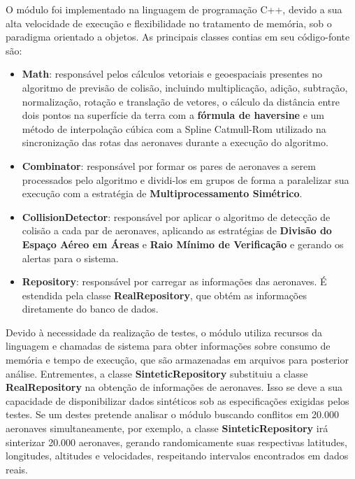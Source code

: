O módulo foi implementado na linguagem de programação C++, devido a sua alta velocidade de execução e flexibilidade no tratamento de memória, sob o paradigma orientado a objetos. As principais classes contias em seu código-fonte são:

\begin{itemize}

\item \textbf{Math}: responsável pelos cálculos vetoriais e geoespaciais presentes no algoritmo de previsão de colisão, incluindo multiplicação, adição, subtração, normalização, rotação e translação de vetores, o cálculo da distância entre dois pontos na superfície da terra com a \textbf{fórmula de haversine} \cite{haversine} e um método de interpolação cúbica com a Spline Catmull-Rom \cite{catmullrom} utilizado na sincronização das rotas das aeronaves durante a execução do algoritmo.

\item \textbf{Combinator}: responsável por formar os pares de aeronaves a serem processados pelo algoritmo e dividi-los em grupos de forma a paralelizar sua execução com a estratégia de \textbf{Multiprocessamento Simétrico}.

\item \textbf{CollisionDetector}: responsável por aplicar o algoritmo de detecção de colisão a cada par de aeronaves, aplicando as estratégias de \textbf{Divisão do Espaço Aéreo em Áreas} e \textbf{Raio Mínimo de Verificação} e gerando os alertas para o sistema.

\item \textbf{Repository}: responsável por carregar as informações das aeronaves. É estendida pela classe \textbf{RealRepository}, que obtém as informações diretamente do banco de dados.

\end{itemize}

Devido à necessidade da realização de testes, o módulo utiliza recursos da linguagem e chamadas de sistema para obter informações sobre consumo de memória e tempo de execução, que são armazenadas em arquivos para posterior análise. Entrementes, a classe \textbf{SinteticRepository} substituiu a classe \textbf{RealRepository} na obtenção de informações de aeronaves. Isso se deve a sua capacidade de disponibilizar dados sintéticos sob as especificações exigidas pelos testes. Se um destes pretende analisar o módulo buscando conflitos em 20.000 aeronaves simultaneamente, por exemplo, a classe \textbf{SinteticRepository} irá sinterizar 20.000 aeronaves, gerando randomicamente suas respectivas latitudes, longitudes, altitudes e velocidades, respeitando intervalos encontrados em dados reais.

